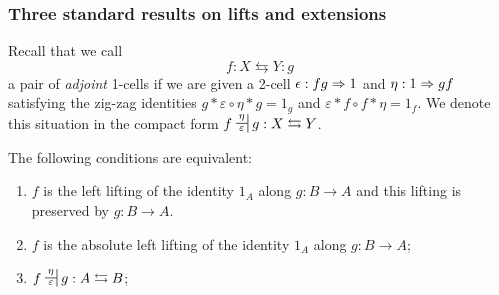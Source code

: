 \subsubsection{Three standard results on lifts and extensions} Recall that we
call
\[ f : X \leftrightarrows Y : g
\] a pair of \emph{adjoint} 1-cells if we are given a 2-cell $\epsilon : fg \Rightarrow
1$ and $\eta : 1\Rightarrow gf$ satisfying the zig-zag identities $g*\varepsilon \circ
\eta * g = 1_g$ and $\varepsilon * f \circ f * \eta = 1_f$. We denote this
situation in the compact form $f \adjunct{\eta}{\varepsilon} g : X
\leftrightarrows Y$.
\begin{lemma}\label{lem_adext1} The following conditions are equivalent:
\begin{enumerate}
	\item $f$ is the left lifting of the identity $1_A$ along $g : B\to A$ and
this lifting is preserved by $g : B\to A$.
	\item $f$ is the absolute left lifting of the identity $1_A$ along $g : B\to
A$;
	\item $f \adjunct{\eta}{\varepsilon} g : A \leftrightarrows B$;
\end{enumerate}
\end{lemma}
